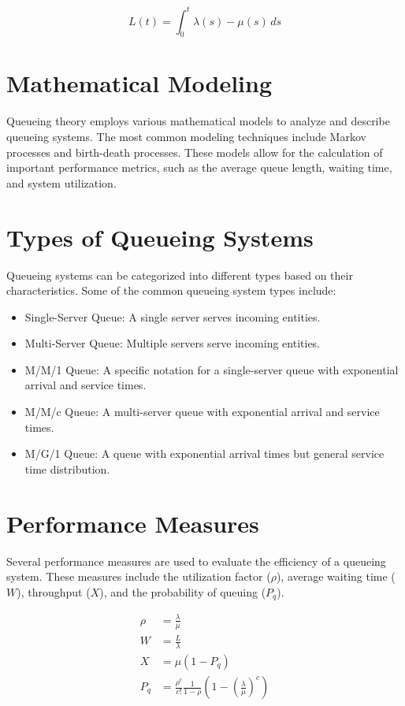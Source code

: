 \documentclass{article}
\begin{document}
\begin{equation}
L(t) = \int_0^t \lambda(s) - \mu(s) \, ds
\end{equation}

\section{Mathematical Modeling}

Queueing theory employs various mathematical models to analyze and describe queueing systems. The most common modeling techniques include Markov processes and birth-death processes. These models allow for the calculation of important performance metrics, such as the average queue length, waiting time, and system utilization.

\section{Types of Queueing Systems}

Queueing systems can be categorized into different types based on their characteristics. Some of the common queueing system types include:

\begin{itemize}
\item Single-Server Queue: A single server serves incoming entities.
\item Multi-Server Queue: Multiple servers serve incoming entities.
\item M/M/1 Queue: A specific notation for a single-server queue with exponential arrival and service times.
\item M/M/c Queue: A multi-server queue with exponential arrival and service times.
\item M/G/1 Queue: A queue with exponential arrival times but general service time distribution.
\end{itemize}

\section{Performance Measures}

Several performance measures are used to evaluate the efficiency of a queueing system. These measures include the utilization factor ($\rho$), average waiting time ($W$), throughput ($X$), and the probability of queuing ($P_q$).

\begin{align}
\rho &= \frac{\lambda}{\mu} \\
W &= \frac{L}{\lambda} \\
X &= \mu(1-P_q) \\
P_q &= \frac{\rho^c}{c!} \frac{1}{1-\rho}\left(1-\left(\frac{\lambda}{\mu}\right)^{c}\right)
\end{align}
\end{document}

